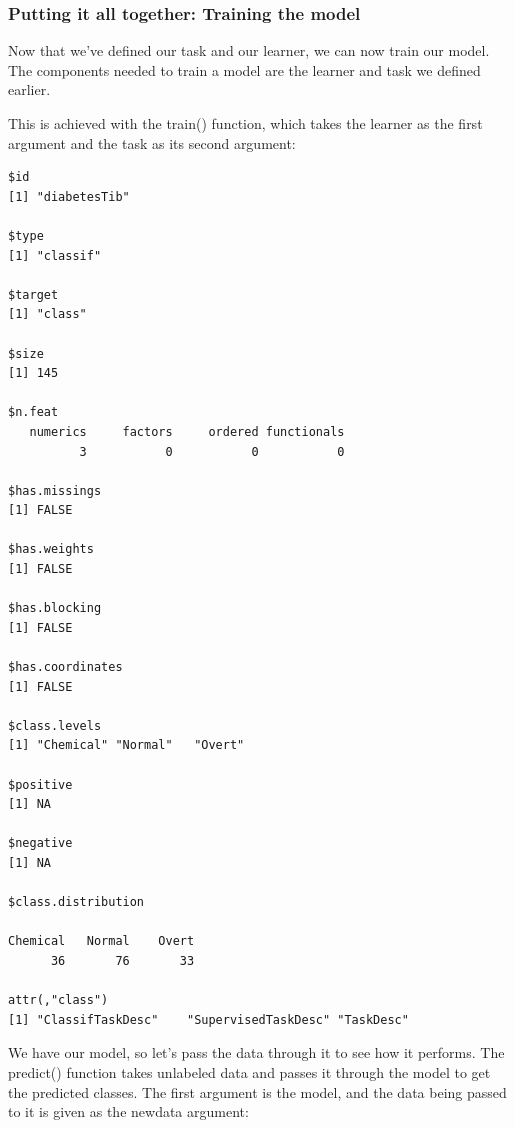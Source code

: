 \documentclass[
]{article}
\newenvironment{Shaded}{\begin{snugshade}}{\end{snugshade}}
\newcommand{\FunctionTok}[1]{\textcolor[rgb]{0.13,0.29,0.53}{\textbf{#1}}}
\newcommand{\NormalTok}[1]{#1}
\newcommand{\OtherTok}[1]{\textcolor[rgb]{0.56,0.35,0.01}{#1}}
\newcommand{\SpecialCharTok}[1]{\textcolor[rgb]{0.81,0.36,0.00}{\textbf{#1}}}
\begin{document}
\subsubsection{Putting it all together: Training the
model}\label{putting-it-all-together-training-the-model}

Now that we've defined our task and our learner, we can now train our
model. The components needed to train a model are the learner and task
we defined earlier.

This is achieved with the train() function, which takes the learner as
the first argument and the task as its second argument:

\begin{Shaded}
\end{Shaded}

\begin{verbatim}
$id
[1] "diabetesTib"

$type
[1] "classif"

$target
[1] "class"

$size
[1] 145

$n.feat
   numerics     factors     ordered functionals 
          3           0           0           0 

$has.missings
[1] FALSE

$has.weights
[1] FALSE

$has.blocking
[1] FALSE

$has.coordinates
[1] FALSE

$class.levels
[1] "Chemical" "Normal"   "Overt"   

$positive
[1] NA

$negative
[1] NA

$class.distribution

Chemical   Normal    Overt 
      36       76       33 

attr(,"class")
[1] "ClassifTaskDesc"    "SupervisedTaskDesc" "TaskDesc"          
\end{verbatim}

We have our model, so let's pass the data through it to see how it
performs. The predict() function takes unlabeled data and passes it
through the model to get the predicted classes. The first argument is
the model, and the data being passed to it is given as the newdata
argument:
\end{document}
